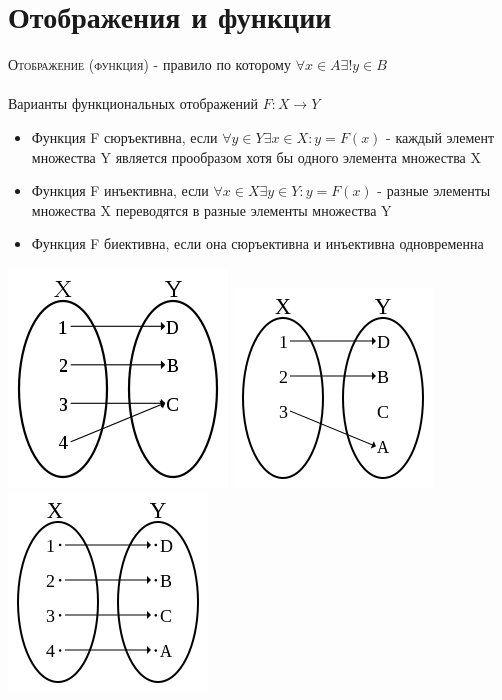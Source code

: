 \documentclass[14pt]{article}
\begin{document}
    \section{Отображения и функции}
        \textsc{Отображение (функция) } - правило по которому $ \forall x \in A \exists ! y \in B $ \\
        \\
        Варианты функциональных отображений $F : X \rightarrow Y $
        \begin{itemize}
            \item Функция F сюръективна, если $ \forall y \in Y \exists x \in X :y = F(x)$ - каждый элемент множества Y является прообразом хотя бы одного элемента множества X
            \item Функция F инъективна, если $ \forall x \in X \exists y \in Y : y = F(x) $ - разные элементы множества X переводятся в разные элементы множества Y
            \item Функция F биективна, если она сюръективна и инъективна одновременна
        \end{itemize}
        \begin{center}
            \includegraphics[scale=0.27]{2-1} 
            \includegraphics[scale=0.3]{2-2}
            \includegraphics[scale=0.3]{2-3}    
        \end{center}
        
        
\end{document}
